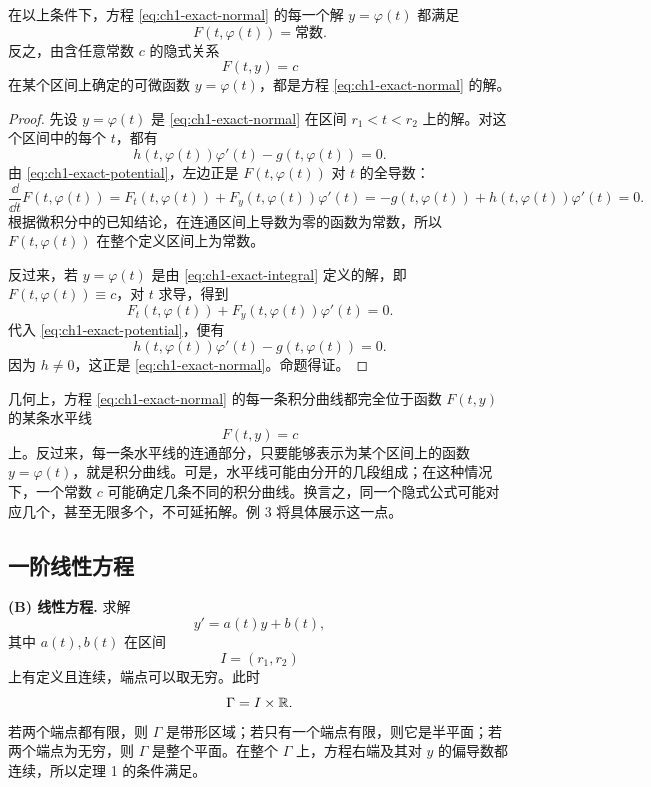 \begin{proposition}[正合方程的解]
 \label{prop:ch1-exact}
 在以上条件下，方程 \eqref{eq:ch1-exact-normal} 的每一个解 \(y=\varphi(t)\) 都满足
 \[
  F(t,\varphi(t))=\text{常数}.
 \]
 反之，由含任意常数 \(c\) 的隐式关系
 \begin{equation}
  F(t,y)=c
  \label{eq:ch1-exact-integral}
 \end{equation}
 在某个区间上确定的可微函数 \(y=\varphi(t)\)，都是方程 \eqref{eq:ch1-exact-normal} 的解。
\end{proposition}

\begin{proof}
先设 \(y=\varphi(t)\) 是 \eqref{eq:ch1-exact-normal} 在区间 \(r_1<t<r_2\) 上的解。对这个区间中的每个 \(t\)，都有
\[
 h(t,\varphi(t))\varphi'(t)-g(t,\varphi(t))=0.
\]
由 \eqref{eq:ch1-exact-potential}，左边正是 \(F(t,\varphi(t))\) 对 \(t\) 的全导数：
\[
 \frac{\dd}{\dd t}F(t,\varphi(t))
 =F_t(t,\varphi(t))+F_y(t,\varphi(t))\varphi'(t)
 =-g(t,\varphi(t))+h(t,\varphi(t))\varphi'(t)=0.
\]
根据微积分中的已知结论，在连通区间上导数为零的函数为常数，所以 \(F(t,\varphi(t))\) 在整个定义区间上为常数。

反过来，若 \(y=\varphi(t)\) 是由 \eqref{eq:ch1-exact-integral} 定义的解，即 \(F(t,\varphi(t))\equiv c\)，对 \(t\) 求导，得到
\[
 F_t(t,\varphi(t))+F_y(t,\varphi(t))\varphi'(t)=0.
\]
代入 \eqref{eq:ch1-exact-potential}，便有
\[
 h(t,\varphi(t))\varphi'(t)-g(t,\varphi(t))=0.
\]
因为 \(h\neq0\)，这正是 \eqref{eq:ch1-exact-normal}。命题得证。
\end{proof}

几何上，方程 \eqref{eq:ch1-exact-normal} 的每一条积分曲线都完全位于函数 \(F(t,y)\) 的某条水平线
\[
 F(t,y)=c
\]
上。反过来，每一条水平线的连通部分，只要能够表示为某个区间上的函数 \(y=\varphi(t)\)，就是积分曲线。可是，水平线可能由分开的几段组成；在这种情况下，一个常数 \(c\) 可能确定几条不同的积分曲线。换言之，同一个隐式公式可能对应几个，甚至无限多个，不可延拓解。例 3 将具体展示这一点。

\subsection{一阶线性方程}

\textbf{(B) 线性方程.} 求解
\begin{equation}
 y'=a(t)y+b(t),
 \label{eq:ch1-linear-scalar}
\end{equation}
其中 \(a(t),b(t)\) 在区间
\[
 I=(r_1,r_2)
\]
上有定义且连续，端点可以取无穷。此时
\[
 \Gamma=I\times\mathbb R.
\]
若两个端点都有限，则 \(\Gamma\) 是带形区域；若只有一个端点有限，则它是半平面；若两个端点为无穷，则 \(\Gamma\) 是整个平面。在整个 \(\Gamma\) 上，方程右端及其对 \(y\) 的偏导数都连续，所以定理 1 的条件满足。

